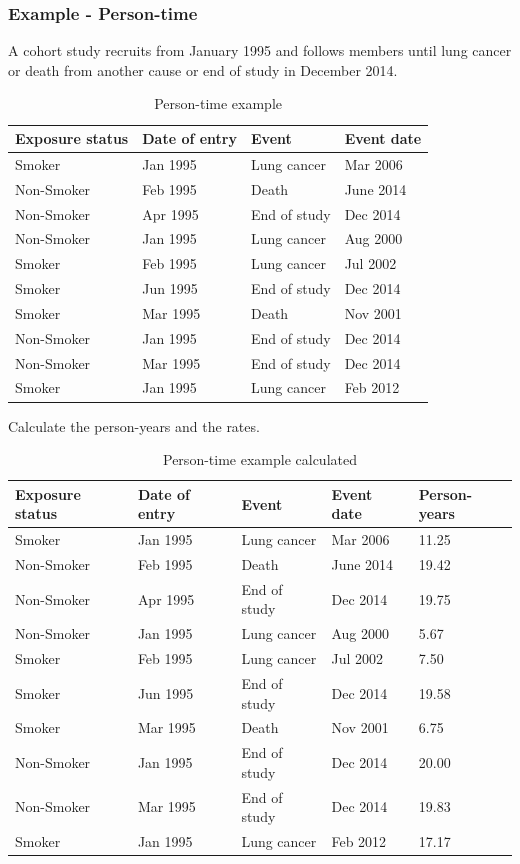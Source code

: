 \documentclass{article}
\begin{document}
\subsubsection{Example - Person-time}
A cohort study recruits from January 1995 and follows members until lung cancer or death from another cause or end of study in December 2014.
\begin{table}[H]
\centering
\begin{tabularx}{\textwidth}{|X|X|X|X|}
\hline
\textbf{Exposure status} & \textbf{Date of entry} & \textbf{Event} & \textbf{Event date} \\ \hline
Smoker & Jan 1995 & Lung cancer & Mar 2006 \\ \hline
Non-Smoker & Feb 1995 & Death & June 2014 \\ \hline
Non-Smoker & Apr 1995 & End of study & Dec 2014 \\ \hline
Non-Smoker & Jan 1995 & Lung cancer & Aug 2000 \\ \hline
Smoker & Feb 1995 & Lung cancer & Jul 2002 \\ \hline
Smoker & Jun 1995 & End of study & Dec 2014 \\ \hline
Smoker & Mar 1995 & Death & Nov 2001 \\ \hline
Non-Smoker & Jan 1995 & End of study & Dec 2014 \\ \hline
Non-Smoker & Mar 1995 & End of study & Dec 2014 \\ \hline
Smoker & Jan 1995 & Lung cancer & Feb 2012 \\ \hline
\end{tabularx}
\caption{Person-time example}
\label{tab:example-person-time}
\end{table}
Calculate the person-years and the rates.
\\
\begin{table}[H]
\centering
\begin{tabularx}{\textwidth}{|X|X|X|X|X|}
\hline
\textbf{Exposure status} & \textbf{Date of entry} & \textbf{Event} & \textbf{Event date} & \textbf{Person-years} \\ \hline
Smoker & Jan 1995 & Lung cancer & Mar 2006 & 11.25 \\ \hline
Non-Smoker & Feb 1995 & Death & June 2014 & 19.42 \\ \hline
Non-Smoker & Apr 1995 & End of study & Dec 2014 & 19.75 \\ \hline
Non-Smoker & Jan 1995 & Lung cancer & Aug 2000 & 5.67 \\ \hline
Smoker & Feb 1995 & Lung cancer & Jul 2002 & 7.50 \\ \hline
Smoker & Jun 1995 & End of study & Dec 2014 & 19.58 \\ \hline
Smoker & Mar 1995 & Death & Nov 2001 & 6.75 \\ \hline
Non-Smoker & Jan 1995 & End of study & Dec 2014 & 20.00 \\ \hline
Non-Smoker & Mar 1995 & End of study & Dec 2014 & 19.83 \\ \hline
Smoker & Jan 1995 & Lung cancer & Feb 2012 & 17.17 \\ \hline
\end{tabularx}
\caption{Person-time example calculated}
\label{tab:example-person-time-calc}
\end{table}
\end{document}
